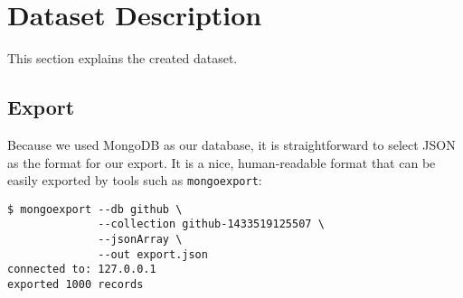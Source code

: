 \section{Dataset Description}\label{sec:dataset-description}

This section explains the created dataset.

\subsection{Export}\label{sec:export}

Because we used MongoDB as our database, it is straightforward to select JSON as the
format for our export. It is a nice, human-readable format that can be easily
exported by tools such as \texttt{mongoexport}:

\begin{lstlisting}
$ mongoexport --db github \
              --collection github-1433519125507 \
              --jsonArray \
              --out export.json
connected to: 127.0.0.1
exported 1000 records
\end{lstlisting}

